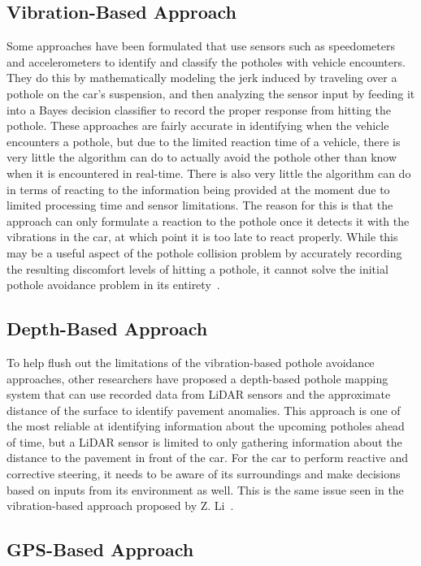 \documentclass{article}
\begin{document}
\subsection{Vibration-Based Approach}

Some approaches have been formulated that use sensors such as speedometers and accelerometers to identify and classify the potholes with vehicle encounters. They do this by mathematically modeling the jerk induced by traveling over a pothole on the car’s suspension, and then analyzing the sensor input by feeding it into a Bayes decision classifier to record the proper response from hitting the pothole. These approaches are fairly accurate in identifying when the vehicle encounters a pothole, but due to the limited reaction time of a vehicle, there is very little the algorithm can do to actually avoid the pothole other than know when it is encountered in real-time. There is also very little the algorithm can do in terms of reacting to the information being provided at the moment due to limited processing time and sensor limitations. The reason for this is that the approach can only formulate a reaction to the pothole once it detects it with the vibrations in the car, at which point it is too late to react properly. While this may be a useful aspect of the pothole collision problem by accurately recording the resulting discomfort levels of hitting a pothole, it cannot solve the initial pothole avoidance problem in its entirety~\cite{li2015road}.

\subsection{Depth-Based Approach}

 To help flush out the limitations of the vibration-based pothole avoidance approaches, other researchers have proposed a depth-based pothole mapping system that can use recorded data from LiDAR sensors and the approximate distance of the surface to identify pavement anomalies. This approach is one of the most reliable at identifying information about the upcoming potholes ahead of time, but a LiDAR sensor is limited to only gathering information about the distance to the pavement in front of the car. For the car to perform reactive and corrective steering, it needs to be aware of its surroundings and make decisions based on inputs from its environment as well. This is the same issue seen in the vibration-based approach proposed by Z. Li~\cite{kang2017pothole}.

\subsection{GPS-Based Approach}
\end{document}
